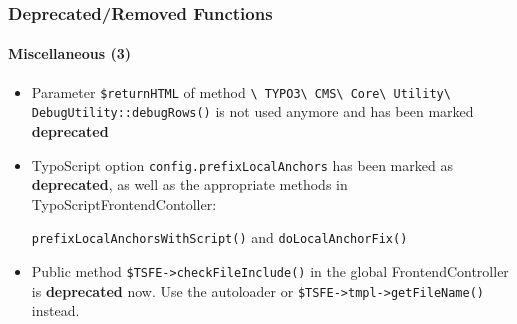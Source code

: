 \begin{frame}[fragile]
	\frametitle{Deprecated/Removed Functions}
	\framesubtitle{Miscellaneous (3)}

	\begin{itemize}

		\item Parameter \texttt{\$returnHTML} of method
			\small
				\texttt{\textbackslash
					TYPO3\textbackslash
					CMS\textbackslash
					Core\textbackslash
					Utility\textbackslash
					DebugUtility::debugRows()}
			\normalsize
			is not used anymore and has been marked \textbf{deprecated}

		\item TypoScript option
			\small\texttt{config.prefixLocalAnchors}\normalsize\space
			has been marked as \textbf{deprecated}, as well as the appropriate
			methods in TypoScriptFrontendContoller:

			\small\texttt{prefixLocalAnchorsWithScript()}\normalsize\space
			and
			\small\texttt{doLocalAnchorFix()}\normalsize

		\item Public method
			\small\texttt{\$TSFE->checkFileInclude()}\normalsize\space
			in the global FrontendController is \textbf{deprecated} now.
			Use the autoloader or \texttt{\$TSFE->tmpl->getFileName()}
			instead.

	\end{itemize}

\end{frame}


